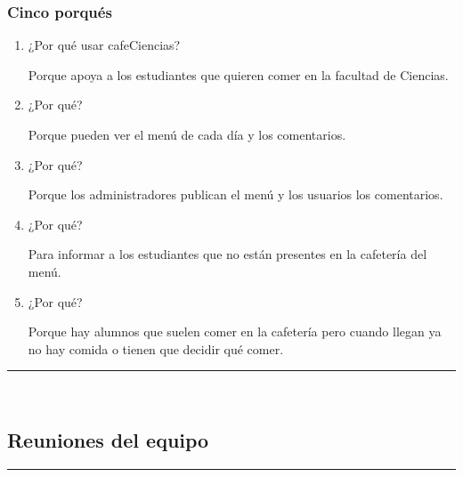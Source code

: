 \documentclass{article}
\begin{document}
\subsubsection*{Cinco porqués}
\begin{enumerate}
\item ¿Por qué usar cafeCiencias?

  Porque apoya a los estudiantes que quieren comer en la facultad de Ciencias.
  
\item ¿Por qué?

  Porque pueden ver el menú de cada día y los comentarios.
  
\item ¿Por qué?

  Porque los administradores publican el menú y los usuarios los comentarios.
  
\item ¿Por qué?

  Para informar a los estudiantes que no están presentes en la cafetería del
  menú.
  
\item ¿Por qué?

  Porque hay alumnos que suelen comer en la cafetería pero cuando llegan ya no
  hay comida o tienen que decidir qué comer.
  
\end{enumerate}
\rule{0.8\textwidth}{.8pt}\\

\subsection*{Reuniones del equipo}

\rule{0.8\textwidth}{.8pt}\\
\end{document}
